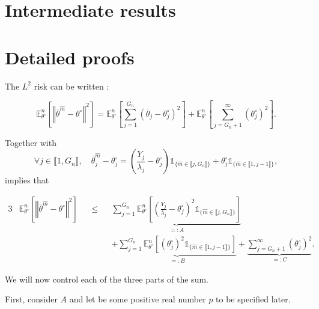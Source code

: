 \section{Intermediate results}

\section{Detailed proofs}

The $L^{2}$ risk can be written :

\[\mathds{E}_{\theta^{\circ}}^{n}\left[\left\Vert \overline{\theta}^{\widehat{m}} - \theta^{\circ} \right\Vert^{2}\right] = \mathds{E}_{\theta^{\circ}}^{n}\left[\sum\limits_{j = 1}^{G_{n}} \left( \overline{\theta}_{j} - \theta^{\circ}_{j} \right)^{2}\right] + \mathds{E}_{\theta^{\circ}}^{n}\left[\sum\limits_{j = G_{n} + 1}^{\infty} \left(\theta^{\circ}_{j}\right)^{2}\right].\]

Together with
\[\forall j \in \llbracket 1, G_{n} \rrbracket, \quad \overline{\theta}^{\widehat{m}}_{j} - \theta^{\circ}_{j} = \left(\frac{Y_{j}}{\lambda_{j}} - \theta^{\circ}_{j}\right) \mathds{1}_{\{\widehat{m} \in \llbracket j, G_{n} \rrbracket\}} + \theta^{\circ}_{j} \mathds{1}_{\{\widehat{m} \in \llbracket 1, j-1 \rrbracket\}},\]
implies that

\begin{alignat*}{3}
& \mathds{E}_{\theta^{\circ}}^{n}\left[\left\Vert \overline{\theta}^{\widehat{m}} - \theta^{\circ} \right\Vert^{2}\right] && \leq && \underbrace{\sum\limits_{j = 1}^{G_{n}}\mathds{E}_{\theta^{\circ}}^{n}\left[\left(\frac{Y_{j}}{\lambda_{j}} - \theta^{\circ}_{j}\right)^{2} \mathds{1}_{\{\widehat{m} \in \llbracket j, G_{n} \rrbracket\}}\right]}_{=: A}\\
& && && + \underbrace{\sum\limits_{j = 1}^{G_{n}}\mathds{E}_{\theta^{\circ}}^{n}\left[\left(\theta^{\circ}_{j}\right)^{2} \mathds{1}_{\{\widehat{m} \in \llbracket 1, j-1 \rrbracket\}}\right]}_{=: B}+ \underbrace{\sum\limits_{j = G_{n} + 1}^{\infty}\left( \theta^{\circ}_{j}\right)^{2}}_{=: C}.
\end{alignat*}

\bigskip

We will now control each of the three parts of the sum.

\bigskip

First, consider $A$ and let be some positive real number $p$ to be specified later.

